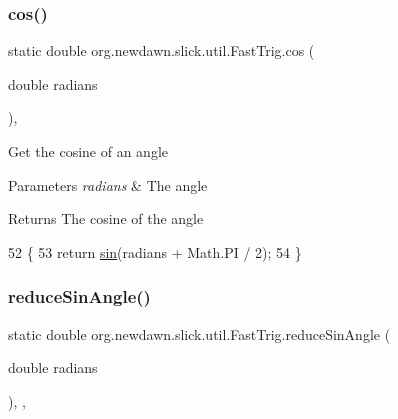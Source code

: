 \subsubsection{\texorpdfstring{cos()}{cos()}}
{\footnotesize\ttfamily static double org.\+newdawn.\+slick.\+util.\+Fast\+Trig.\+cos (\begin{DoxyParamCaption}\item[{double}]{radians }\end{DoxyParamCaption})\hspace{0.3cm}{\ttfamily [inline]}, {\ttfamily [static]}}

Get the cosine of an angle


\begin{DoxyParams}{Parameters}
{\em radians} & The angle \\
\hline
\end{DoxyParams}
\begin{DoxyReturn}{Returns}
The cosine of the angle 
\end{DoxyReturn}

\begin{DoxyCode}
52                                              \{
53         \textcolor{keywordflow}{return} \mbox{\hyperlink{classorg_1_1newdawn_1_1slick_1_1util_1_1_fast_trig_afb5f3af5e68974ea439119bd3eb365a5}{sin}}(radians + Math.PI / 2);
54     \}
\end{DoxyCode}
\mbox{\label{classorg_1_1newdawn_1_1slick_1_1util_1_1_fast_trig_a91525588388e9e09ba6694764a77545b}} 
\subsubsection{\texorpdfstring{reduce\+Sin\+Angle()}{reduceSinAngle()}}
{\footnotesize\ttfamily static double org.\+newdawn.\+slick.\+util.\+Fast\+Trig.\+reduce\+Sin\+Angle (\begin{DoxyParamCaption}\item[{double}]{radians }\end{DoxyParamCaption})\hspace{0.3cm}{\ttfamily [inline]}, {\ttfamily [static]}, {\ttfamily [private]}}

